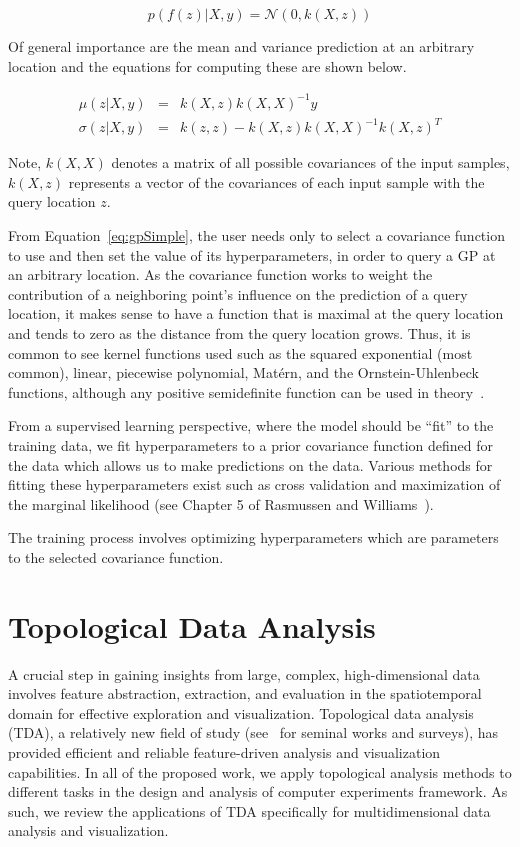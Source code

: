 \begin{equation}
p(f(z)|X,y) = \mathcal{N}(0,k(X,z))
\label{eq:gpSimple}
\end{equation}

Of general importance are the mean and variance prediction at an arbitrary location and the equations for computing these are shown below.

\begin{eqnarray}
\mu(z|X,y) & = & k(X,z)k(X,X)^{-1}y\\
\sigma(z|X,y) & = & k(z,z) - k(X,z)k(X,X)^{-1}k(X,z)^T
\end{eqnarray}

Note, $k(X,X)$ denotes a matrix of all possible covariances of the input samples, $k(X,z)$ represents a vector of the covariances of each input sample with the query location $z$.

From Equation~\ref{eq:gpSimple}, the user needs only to select a covariance function to use and then set the value of its hyperparameters, in order to query a GP at an arbitrary location.
%
As the covariance function works to weight the contribution of a neighboring point's influence on the prediction of a query location, it makes sense to have a function that is maximal at the query location and tends to zero as the distance from the query location grows.
%
Thus, it is common to see kernel functions used such as the squared exponential (most common), linear, piecewise polynomial, Mat\'{e}rn, and the Ornstein-Uhlenbeck functions, although any positive semidefinite function can be used in theory~\cite{RasmussenWilliams2006}.

From a supervised learning perspective, where the model should be ``fit'' to the training data, we fit hyperparameters to a prior covariance function defined for the data which allows us to make predictions on the data.
%
Various methods for fitting these hyperparameters exist such as cross validation and maximization of the marginal likelihood (see Chapter 5 of Rasmussen and Williams~\cite{RasmussenWilliams2006}).

The training process involves optimizing hyperparameters which are parameters to the selected covariance function.

\section{Topological Data Analysis}
A crucial step in gaining insights from large, complex, high-dimensional data involves feature abstraction, extraction, and evaluation in the spatiotemporal domain for effective exploration and visualization.
%
Topological data analysis (TDA), a relatively new field of study (see~\cite{EdsbrunnerHarer2010,Zomorodian2005,BiasottisDeFlorianiFalcidieno2008,Carlsson2009,EdelsbrunnerHarer2008,Ghrist2009} for seminal works and surveys), has provided efficient and reliable feature-driven analysis and visualization capabilities.
%
In all of the proposed work, we apply topological analysis methods to different tasks in the design and analysis of computer experiments framework.
%
As such, we review the applications of TDA specifically for multidimensional data analysis and visualization.

